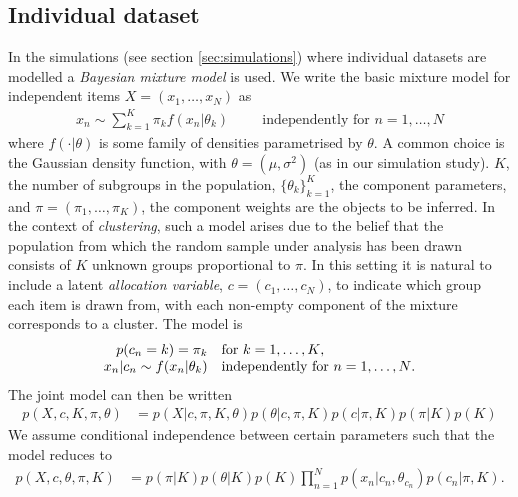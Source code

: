 \documentclass[]{article}
\begin{document}
\subsection{Individual dataset}
In the simulations (see section \ref{sec:simulations}) where individual datasets are modelled a \emph{Bayesian mixture model} is used. We write the basic mixture model for independent items $X=(x_1, \ldots, x_N)$ as 
\begin{align}
	x_n \sim \sum_{k=1}^K\pi_k f(x_n | \theta_k) \hspace{1cm} \textrm{independently for $n = 1,\ldots,N$}
\end{align}
where $f(\cdot| \theta)$ is some family of densities parametrised by $\theta$. A common choice is the Gaussian density function, with $\theta=(\mu, \sigma^2)$ (as in our simulation study). $K$, the number of subgroups in the population, $\{\theta_k\}_{k=1}^K$, the component parameters, and $\pi=(\pi_1, \ldots, \pi_K)$, the component weights are the objects to be inferred. In the context of \emph{clustering}, such a model arises due to the belief that the population from which the random sample under analysis has been drawn consists of $K$ unknown groups proportional to $\pi$. In this setting it is natural to include a latent \emph{allocation variable}, $c=(c_1, \ldots, c_N)$, to indicate which group each item is drawn from, with each non-empty component of the mixture corresponds to a cluster. The model is
\begin{equation}
	\label{eqn:mixModel}
	\begin{array}{r@{}l l}
		p(c_n = k) = \pi_k&  &\textrm{for $k = 1,\ldots,K$,} \\
		x_n | c_n \sim f(x_n | \theta_k)& &\textrm{independently for $n = 1,\ldots,N$.} 
	\end{array}
\end{equation}
The joint model can then be written
\begin{align}
	p(X, c, K, \pi, \theta) &= p(X | c, \pi, K, \theta) p(\theta | c, \pi, K) p(c | \pi, K) p(\pi | K) p(K) \nonumber
\end{align}
We assume conditional independence between certain parameters such that the model reduces to
\begin{align}
	p(X, c, \theta, \pi, K) &=  p(\pi | K) p(\theta | K) p(K) \prod_{n=1}^N p(x_n | c_n, \theta_{c_n}) p (c_n | \pi, K).  \label{eqn:jointMixModel}
\end{align}
\end{document}
